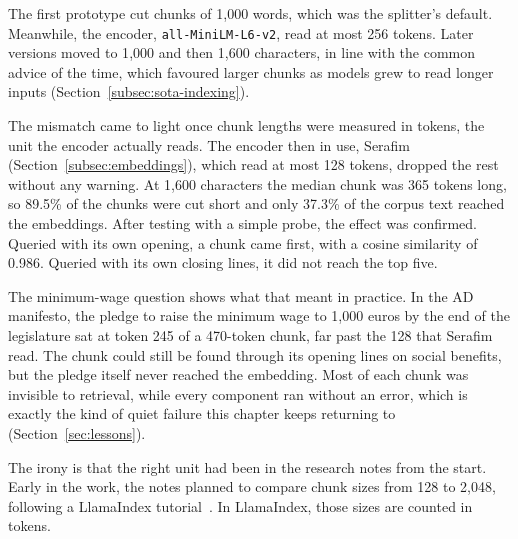 The first prototype cut chunks of 1{,}000 words, which was the splitter's default.
Meanwhile, the encoder, \texttt{all-MiniLM-L6-v2}, read at most 256 tokens. Later
versions moved to 1{,}000 and then 1{,}600 characters, in line with the common advice
of the time, which favoured larger chunks as models grew to read longer
inputs (Section~\ref{subsec:sota-indexing}).

The mismatch came to light once chunk lengths were measured in tokens, the
unit the encoder actually reads. The encoder then in use, Serafim
(Section~\ref{subsec:embeddings}), which read at most 128 tokens, dropped the rest
without any warning. At 1{,}600 characters the median chunk was 365 tokens
long, so 89.5\% of the chunks were cut short and only 37.3\% of the corpus text
reached the embeddings. After testing with a simple probe, the effect was confirmed.
Queried with its own opening, a chunk came first, with a cosine similarity of 0.986.
Queried with its own closing lines, it did not reach the top five.

The minimum-wage question shows what that meant in practice. In the AD
manifesto, the pledge to raise the minimum wage to 1{,}000 euros by the end
of the legislature sat at token 245 of a 470-token chunk, far past the 128
that Serafim read. The chunk could still be found through its opening lines
on social benefits, but the pledge itself never reached the embedding. Most
of each chunk was invisible to retrieval, while every component ran without an error, which
is exactly the kind of quiet failure this chapter keeps returning to
(Section~\ref{sec:lessons}).

The irony is that the right unit had been in the research notes from the
start. Early in the work, the notes planned to compare chunk sizes from 128 to
2{,}048, following a LlamaIndex tutorial~\citep{theja2023chunksize}. In
LlamaIndex, those sizes are counted in tokens.

